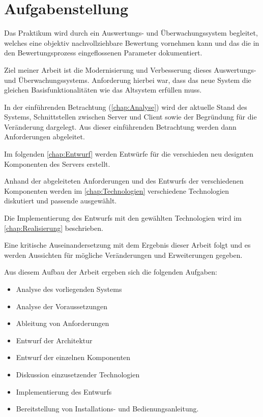 \section{Aufgabenstellung}
\label{sec:Aufgabenstellung}
Das Praktikum wird durch ein Auswertungs- und Überwachungssystem begleitet, welches eine objektiv nachvollziehbare Bewertung vornehmen kann und das die in den Bewertungsprozess eingeflossenen Parameter dokumentiert. \cite[S. 2]{sosnaKonzeptionUndRealisierung2010}

Ziel meiner Arbeit ist die Modernisierung und Verbesserung dieses Auswertungs- und Überwachungssystems. Anforderung hierbei war, dass das neue System die gleichen Basisfunktionalitäten wie das Altsystem erfüllen muss.

In der einführenden Betrachtung (\autoref{chap:Analyse}) wird der aktuelle Stand des Systems, Schnittstellen zwischen Server und Client sowie der Begründung für die Veränderung dargelegt. Aus dieser einführenden Betrachtung werden dann Anforderungen abgeleitet.

Im folgenden \autoref{chap:Entwurf} werden Entwürfe für die verschieden neu designten Komponenten des Servers erstellt. 

Anhand der abgeleiteten Anforderungen und des Entwurfs der verschiedenen Komponenten werden im \autoref{chap:Technologien} verschiedene Technologien diskutiert und passende ausgewählt.

Die Implementierung des Entwurfs mit den gewählten Technologien wird im \autoref{chap:Realisierung} beschrieben.

Eine kritische Auseinandersetzung mit dem Ergebnis dieser Arbeit folgt und es werden Aussichten für mögliche Veränderungen und Erweiterungen gegeben.

Aus diesem Aufbau der Arbeit ergeben sich die folgenden Aufgaben:
\begin{itemize}
	\item Analyse des vorliegenden Systems
	\item Analyse der Voraussetzungen
	\item Ableitung von Anforderungen
	\item Entwurf der Architektur
	\item Entwurf der einzelnen Komponenten
	\item Diskussion einzusetzender Technologien
	\item Implementierung des Entwurfs
	\item Bereitstellung von Installations- und Bedienungsanleitung.
\end{itemize}
